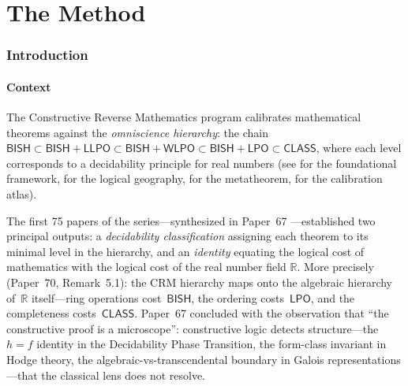 \documentclass[11pt]{article}
\theoremstyle{plain}
\theoremstyle{definition}
\theoremstyle{remark}
\newcommand{\RR}{\mathbb{R}}
\newcommand{\BISH}{\mathsf{BISH}}
\newcommand{\LPO}{\mathsf{LPO}}
\newcommand{\WLPO}{\mathsf{WLPO}}
\newcommand{\LLPO}{\mathsf{LLPO}}
\newcommand{\CLASS}{\mathsf{CLASS}}
\begin{document}
\begin{abstract}
The generative phase comprises ${\sim}8{,}000$ lines of Lean~4 code
with zero \texttt{sorry}, all verified against Mathlib on toolchain
\texttt{v4.29.0-rc2}.  The Squeeze protocol is implemented via
\emph{asymmetric offloading}: a Python CAS computes symbolic
identities that Lean's kernel certifies, separating unbounded symbolic
computation from foundational verification.

Paper~67 concluded: ``The constructive proof is a microscope.''
This paper demonstrates that the microscope is now automated.
\end{abstract}

\tableofcontents


\part{The Method}\label{part:method}

\section{Introduction}\label{sec:intro}

\subsection{Context}

The Constructive Reverse Mathematics program calibrates mathematical
theorems against the \emph{omniscience hierarchy}: the chain
$\BISH \subset \BISH + \LLPO \subset \BISH + \WLPO \subset
\BISH + \LPO \subset \CLASS$,
where each level corresponds to a decidability principle for real
numbers (see \cite{bridges-richman} for the foundational framework,
\cite{p10} for the logical geography, \cite{p35} for the metatheorem,
\cite{p50} for the calibration atlas).

The first 75 papers of the series---synthesized in Paper~67
\cite{p67}---established two principal outputs: a \emph{decidability
classification} assigning each theorem to its minimal level in the
hierarchy, and an \emph{identity} equating the logical cost of
mathematics with the logical cost of the real number field $\RR$.
More precisely (Paper~70, Remark~5.1): the CRM hierarchy maps onto
the algebraic hierarchy of~$\RR$ itself---ring operations
cost~$\BISH$, the ordering costs~$\LPO$, and the completeness
costs~$\CLASS$.  Paper~67 concluded with the observation that ``the
constructive proof is a microscope'': constructive logic detects
structure---the $h = f$ identity in the Decidability Phase Transition,
the form-class invariant in Hodge theory, the algebraic-vs-transcendental
boundary in Galois representations---that the classical lens does not
resolve.
\end{document}
